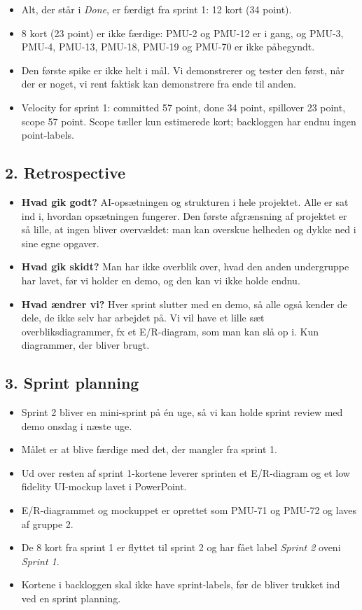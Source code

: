\documentclass[a4paper,11pt]{article}
\begin{document}
\begin{itemize}
    \item Alt, der står i \emph{Done}, er færdigt fra sprint 1: 12 kort (34 point).
    \item 8 kort (23 point) er ikke færdige: PMU-2 og PMU-12 er i gang, og PMU-3, PMU-4, PMU-13, PMU-18, PMU-19 og PMU-70 er ikke påbegyndt.
    \item Den første spike er ikke helt i mål. Vi demonstrerer og tester den først, når der er noget, vi rent faktisk kan demonstrere fra ende til anden.
    \item Velocity for sprint 1: committed 57 point, done 34 point, spillover 23 point, scope 57 point. Scope tæller kun estimerede kort; backloggen har endnu ingen point-labels.
\end{itemize}

\subsection*{2. Retrospective}

\begin{itemize}
    \item \textbf{Hvad gik godt?} AI-opsætningen og strukturen i hele projektet. Alle er sat ind i, hvordan opsætningen fungerer. Den første afgrænsning af projektet er så lille, at ingen bliver overvældet: man kan overskue helheden og dykke ned i sine egne opgaver.
    \item \textbf{Hvad gik skidt?} Man har ikke overblik over, hvad den anden undergruppe har lavet, før vi holder en demo, og den kan vi ikke holde endnu.
    \item \textbf{Hvad ændrer vi?} Hver sprint slutter med en demo, så alle også kender de dele, de ikke selv har arbejdet på. Vi vil have et lille sæt overbliksdiagrammer, fx et E/R-diagram, som man kan slå op i. Kun diagrammer, der bliver brugt.
\end{itemize}

\subsection*{3. Sprint planning}

\begin{itemize}
    \item Sprint 2 bliver en mini-sprint på én uge, så vi kan holde sprint review med demo onsdag i næste uge.
    \item Målet er at blive færdige med det, der mangler fra sprint 1.
    \item Ud over resten af sprint 1-kortene leverer sprinten et E/R-diagram og et low fidelity UI-mockup lavet i PowerPoint.
    \item E/R-diagrammet og mockuppet er oprettet som PMU-71 og PMU-72 og laves af gruppe 2.
    \item De 8 kort fra sprint 1 er flyttet til sprint 2 og har fået label \emph{Sprint 2} oveni \emph{Sprint 1}.
    \item Kortene i backloggen skal ikke have sprint-labels, før de bliver trukket ind ved en sprint planning.
\end{itemize}
\end{document}
